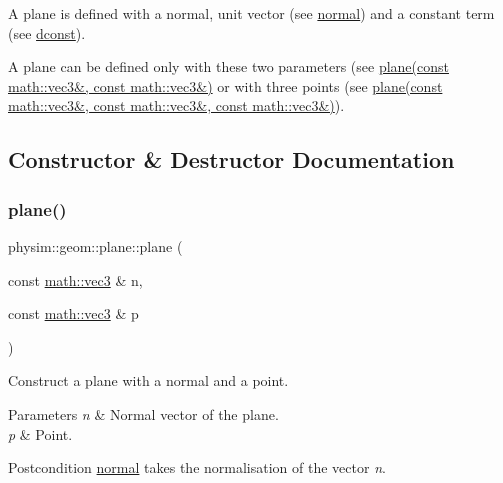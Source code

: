 A plane is defined with a normal, unit vector (see \hyperlink{classphysim_1_1geom_1_1plane_ab9502f59c7c72083fe4ab166ad8e637a}{normal}) and a constant term (see \hyperlink{classphysim_1_1geom_1_1plane_a80867844aac8461bd644cca6de9ef739}{dconst}).

A plane can be defined only with these two parameters (see \hyperlink{classphysim_1_1geom_1_1plane_aeb026d0e17e529a5709fb833e3c0f2a0}{plane(const math\+::vec3\&, const math\+::vec3\&)} or with three points (see \hyperlink{classphysim_1_1geom_1_1plane_a2dd759ec4519cfd2fb943bda36988f9a}{plane(const math\+::vec3\&, const math\+::vec3\&, const math\+::vec3\&)}). 

\subsection{Constructor \& Destructor Documentation}
\mbox{\label{classphysim_1_1geom_1_1plane_aeb026d0e17e529a5709fb833e3c0f2a0}} 
\subsubsection{\texorpdfstring{plane()}{plane()}\hspace{0.1cm}{\footnotesize\ttfamily [1/3]}}
{\footnotesize\ttfamily physim\+::geom\+::plane\+::plane (\begin{DoxyParamCaption}\item[{const \hyperlink{structphysim_1_1math_1_1vec3}{math\+::vec3} \&}]{n,  }\item[{const \hyperlink{structphysim_1_1math_1_1vec3}{math\+::vec3} \&}]{p }\end{DoxyParamCaption})}



Construct a plane with a normal and a point. 


\begin{DoxyParams}{Parameters}
{\em n} & Normal vector of the plane. \\
\hline
{\em p} & Point. \\
\hline
\end{DoxyParams}
\begin{DoxyPostcond}{Postcondition}
\hyperlink{classphysim_1_1geom_1_1plane_ab9502f59c7c72083fe4ab166ad8e637a}{normal} takes the normalisation of the vector {\itshape n}. 
\end{DoxyPostcond}
\mbox{\label{classphysim_1_1geom_1_1plane_aaf64dcf023556f15e3705fa0269a2675}} 
